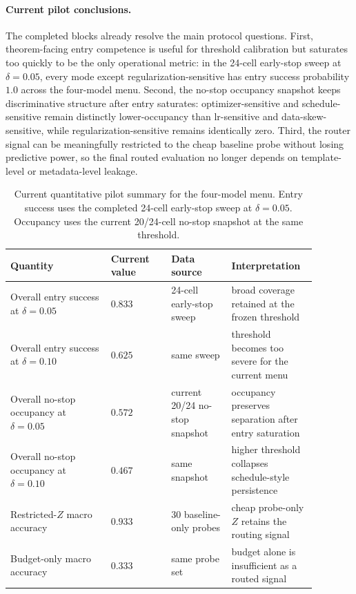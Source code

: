 \documentclass{article}
\begin{document}
\paragraph{Current pilot conclusions.}
The completed blocks already resolve the main protocol questions.
First, theorem-facing entry competence is useful for threshold calibration but saturates too quickly to be the only operational metric: in the 24-cell early-stop sweep at $\delta=0.05$, every mode except regularization-sensitive has entry success probability $1.0$ across the four-model menu.
Second, the no-stop occupancy snapshot keeps discriminative structure after entry saturates: optimizer-sensitive and schedule-sensitive remain distinctly lower-occupancy than lr-sensitive and data-skew-sensitive, while regularization-sensitive remains identically zero.
Third, the router signal can be meaningfully restricted to the cheap baseline probe without losing predictive power, so the final routed evaluation no longer depends on template-level or metadata-level leakage.

\begin{table}[t]
\centering
\small
\caption{Current quantitative pilot summary for the four-model menu.
Entry success uses the completed 24-cell early-stop sweep at $\delta=0.05$.
Occupancy uses the current 20/24-cell no-stop snapshot at the same threshold.}
\label{tab:claim-map}
\begin{tabular}{@{}p{0.30\linewidth}p{0.18\linewidth}p{0.18\linewidth}p{0.22\linewidth}@{}}
\toprule
Quantity & Current value & Data source & Interpretation \\
\midrule
Overall entry success at $\delta=0.05$ & $0.833$ & 24-cell early-stop sweep & broad coverage retained at the frozen threshold \\
Overall entry success at $\delta=0.10$ & $0.625$ & same sweep & threshold becomes too severe for the current menu \\
Overall no-stop occupancy at $\delta=0.05$ & $0.572$ & current 20/24 no-stop snapshot & occupancy preserves separation after entry saturation \\
Overall no-stop occupancy at $\delta=0.10$ & $0.467$ & same snapshot & higher threshold collapses schedule-style persistence \\
Restricted-$Z$ macro accuracy & $0.933$ & 30 baseline-only probes & cheap probe-only $Z$ retains the routing signal \\
Budget-only macro accuracy & $0.333$ & same probe set & budget alone is insufficient as a routed signal \\
\bottomrule
\end{tabular}
\end{table}
\end{document}
